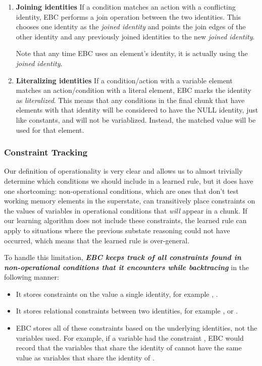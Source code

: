 \begin{enumerate}
	\item \textbf{Joining identities} \newline 
	If a condition matches an action with a conflicting identity, EBC performs a join operation between the two identities. This chooses one identity as the \textit{joined identity} and points the join edges of the other identity and any previously joined identities to the new \textit{joined identity}.

	Note that any time EBC uses an element's identity, it is actually using the \textit{joined identity}.
	
	\item \textbf{Literalizing identities} \newline
	If a condition/action with a variable element matches an action/condition with a literal element, EBC marks the identity as \textit{literalized}.  This means that any conditions in the final chunk that have elements with that identity will be considered to have the NULL identity, just like constants, and will not be variablized.  Instead, the matched value will be used for that element.
\end{enumerate}

\subsubsection{Constraint Tracking}

Our definition of operationality is very clear and allows us to almost trivially determine which conditions we should include in a learned rule, but it does have one shortcoming: non-operational conditions, which are ones that don't test working memory elements in the superstate, can transitively place constraints on the values of variables in operational conditions that \textit{will} appear in a chunk.  If our learning algorithm does not include these constraints, the learned rule can apply to situations where the previous substate reasoning could not have occurred, which means that the learned rule is over-general.

To handle this limitation, \textbf{\textit{EBC keeps track of all constraints found in \\ non-operational conditions that it encounters while backtracing}} in the following manner:

\begin{itemize}
	\item It stores constraints on the value a single identity, for example , .
	\item It stores relational constraints between two identities, for example ,   or  .  
	\item EBC stores all of these constraints based on the underlying identities, not the variables used.  For example, if a variable  had the constraint , EBC would record that the variables that share the identity of  cannot have the same value as variables that share the identity of .
\end{itemize}

